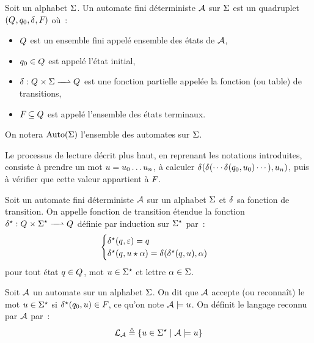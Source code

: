 \begin{definition}
  Soit un alphabet $\Sigma$. Un automate fini déterministe $\mathcal{A}$ sur $\Sigma$
  est un quadruplet $(Q_{},q_{0},\delta_{},F_{})$ où~:
  \begin{itemize}
  \item $Q_{}$ est un ensemble fini appelé ensemble des états de $\mathcal{A}$,
  \item $q_{0} \in Q_{}$ est appelé l'état initial,
  \item $\makeFunNamePartial{\trA}{\varQQ\times \ABA}{\varQQ}$ est une fonction
    partielle appelée la fonction (ou table) de transitions,
  \item $F_{} \subseteq Q_{}$ est appelé l'ensemble des états terminaux.
  \end{itemize}

  On notera $\auto(\ABA)$ l'ensemble des automates sur $\Sigma$.
  \index[notation]{$\auto(\ABA)$}
\end{definition}

Le processus de lecture décrit plus haut, en reprenant les notations
introduites, consiste à prendre un mot $u = u_0\ldots u_n$, à
calculer $\delta_{}(\delta_{}(\cdots\delta_{}(q_{0},u_0)\cdots),u_n)$, puis à
vérifier que cette valeur appartient à $F_{}$.

\begin{definition}
  Soit un automate fini déterministe $\mathcal{A}$ sur un alphabet $\Sigma$ et $\delta_{}$
  sa fonction de transition. On appelle fonction de transition étendue la
  fonction $\makeFunNamePartial{\trAS}{\varQQ\times\toStA}{\varQQ}$ définie par
  induction sur $\Sigma^{\star}$ par~:
  \[\begin{cases}
  \delta_{}^{\star}(q_{},\varepsilon) = q_{} \\
  \delta_{}^{\star}(q_{},u\mathbin{\star} \alpha) = \delta_{}(\delta_{}^{\star}(q_{},u),\alpha)
  \end{cases}\]
  pour tout état $q \in Q_{}$, mot $u \in \Sigma^{\star}$ et lettre
  $\alpha \in \Sigma$.
\end{definition}

\begin{definition}
  Soit $\mathcal{A}$ un automate sur un alphabet $\Sigma$. On dit que $\mathcal{A}$
  accepte (ou reconnaît) le mot $u \in \Sigma^{\star}$ si
  $\delta_{}^{\star}(q_{0},u) \in F_{}$, ce qu'on note $\varAuA \satisf \varwd$. On
  définit le langage reconnu par $\mathcal{A}$ par~:
  \[\mathcal L_{\mathcal{A}} \triangleq \left\{ u \in \Sigma^{\star} \;\middle\vert\; \mathcal{A}\models u \right\}\]
  \index[notation]{$\varAuA\satisf\varwd$}
\end{definition}


